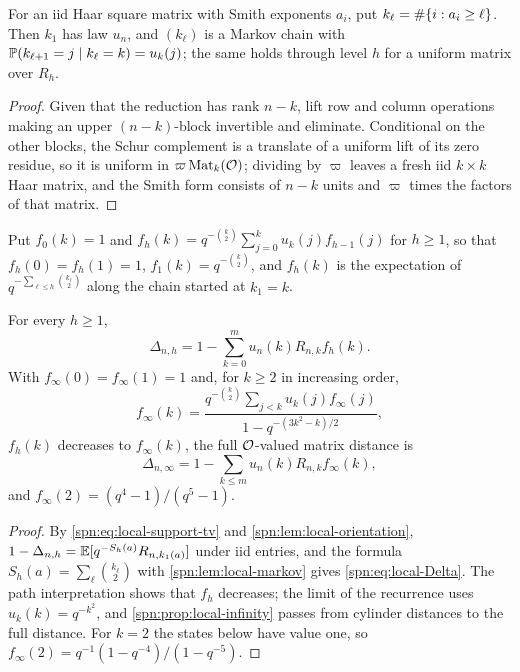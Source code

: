 \begin{lemma}\label{spn:lem:local-markov}
For an iid Haar square matrix with Smith exponents $a_i$, put $k_\ell=\#\{i:a_i\ge\ell\}$. Then $k_1$
has law $u_n$, and $(k_\ell)$ is a Markov chain with $\mathbb{P}(k_{\ell+1}=j\mid k_\ell=k)=u_k(j)$; the same
holds through level $h$ for a uniform matrix over $R_h$.
\end{lemma}
\begin{proof}
Given that the reduction has rank $n-k$, lift row and column operations making an upper
$(n-k)$-block invertible and eliminate. Conditional on the other blocks, the Schur complement is a
translate of a uniform lift of its zero residue, so it is uniform in $\varpi\operatorname{Mat}_k(\mathcal{O})$; dividing by
$\varpi$ leaves a fresh iid $k\times k$ Haar matrix, and the Smith form consists of $n-k$ units and
$\varpi$ times the factors of that matrix.
\end{proof}

Put $f_0(k)=1$ and $f_h(k)=q^{-\binom k2}\sum_{j=0}^ku_k(j)f_{h-1}(j)$ for $h\ge1$, so that
$f_h(0)=f_h(1)=1$, $f_1(k)=q^{-\binom k2}$, and $f_h(k)$ is the expectation of
$q^{-\sum_{\ell\le h}\binom{k_\ell}2}$ along the chain started at $k_1=k$.

\begin{theorem}\label{spn:thm:local-precision}
For every $h\ge1$,
\begin{equation}\label{spn:eq:local-Delta}
 \Delta_{n,h}=1-\sum_{k=0}^mu_n(k)R_{n,k}f_h(k).
\end{equation}
With $f_\infty(0)=f_\infty(1)=1$ and, for $k\ge2$ in increasing order,
\[
 f_\infty(k)=\frac{q^{-\binom k2}\sum_{j<k}u_k(j)f_\infty(j)}{1-q^{-(3k^2-k)/2}},
\]
$f_h(k)$ decreases to $f_\infty(k)$, the full $\mathcal{O}$-valued matrix distance is
\[
 \Delta_{n,\infty}=1-\sum_{k\le m}u_n(k)R_{n,k}f_\infty(k),
\]
and $f_\infty(2)=(q^4-1)/(q^5-1)$.
\end{theorem}
\begin{proof}
By \eqref{spn:eq:local-support-tv} and \cref{spn:lem:local-orientation},
$1-\Delta_{n,h}=\mathbb{E}[q^{-S_h(a)}R_{n,k_1(a)}]$ under iid entries, and the formula
$S_h(a)=\sum_\ell\binom{k_\ell}2$ with \cref{spn:lem:local-markov} gives \eqref{spn:eq:local-Delta}. The
path interpretation shows that $f_h$ decreases; the limit of the recurrence uses $u_k(k)=q^{-k^2}$, and
\cref{spn:prop:local-infinity} passes from cylinder distances to the full distance. For $k=2$ the
states below have value one, so $f_\infty(2)=q^{-1}(1-q^{-4})/(1-q^{-5})$.
\end{proof}

